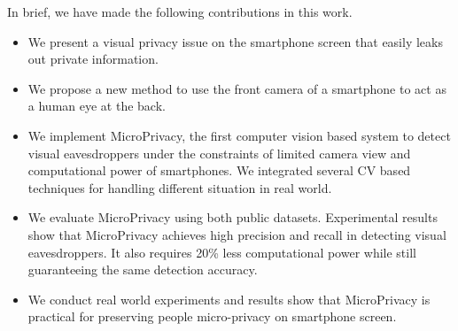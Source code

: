 



In brief, we have made the following contributions in this work.
\begin{itemize}
\item We present a visual privacy issue on the smartphone screen that easily leaks out private information.  
\item We propose a new method to use the front camera of a smartphone to act as a human eye at the back.
\item We implement MicroPrivacy, the first computer vision based system to detect visual eavesdroppers under the constraints of limited camera view and computational power of smartphones.
We integrated several CV based techniques  for handling different situation in real world.
\item We evaluate MicroPrivacy  using both public datasets. Experimental results show that MicroPrivacy  achieves high precision and recall in detecting visual eavesdroppers. It also requires 20\% less computational power while still guaranteeing the same detection accuracy.
\item We conduct real world experiments and results show that MicroPrivacy is practical for preserving people micro-privacy on smartphone screen.
\end{itemize}


